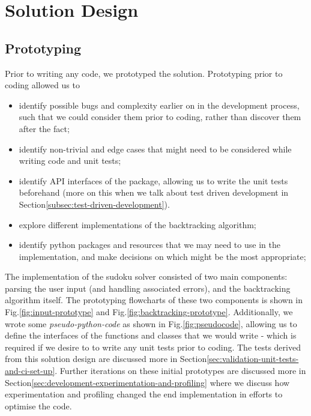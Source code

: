 
\section{Solution Design}\label{sec:solution-design}
    \subsection{Prototyping}\label{subsec:prototyping}
    Prior to writing any code, we prototyped the solution.
    Prototyping prior to coding allowed us to
    \begin{itemize}
        \item identify possible bugs and complexity earlier on in the development process, such that we could consider them
        prior to coding, rather than discover them after the fact;
        \item identify non-trivial and edge cases that might need to be considered while writing code and unit tests;
        \item identify API interfaces of the package, allowing us to write the unit tests beforehand (more on this when
        we talk about test driven development in Section\eqref{subsec:test-driven-development}).
        \item explore different implementations of the backtracking algorithm;
        \item identify python packages and resources that we may need to use in the implementation, and make decisions on which
        might be the most appropriate;
    \end{itemize}
    The implementation of the sudoku solver consisted of two main components: parsing the user input (and handling
    associated errors), and the backtracking algorithm itself.
    The prototyping flowcharts of these two components is shown in Fig.\eqref{fig:input-prototype} and Fig.\eqref{fig:backtracking-prototype}.
    Additionally, we wrote some \textit{pseudo-python-code} as shown in Fig.\eqref{fig:pseudocode}, allowing us to define
    the interfaces of the functions and classes that we would write - which is required if we desire to to write any unit
    tests prior to coding.
    The tests derived from this solution design are discussed more in Section\eqref{sec:validation-unit-tests-and-ci-set-up}.
    Further iterations on these initial prototypes are discussed more in Section\eqref{sec:development-experimentation-and-profiling}
    where we discuss how experimentation and profiling changed the end implementation in efforts to optimise the code.

